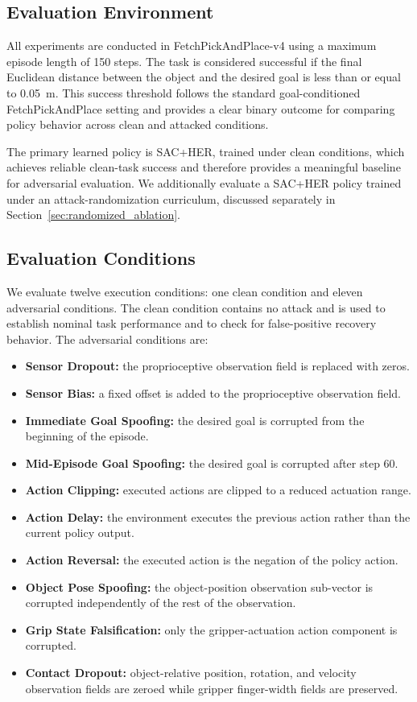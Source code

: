\documentclass[conference]{IEEEtran}
\begin{document}
\subsection{Evaluation Environment}

All experiments are conducted in FetchPickAndPlace-v4 using a maximum episode length of
150 steps. The task is considered successful if the final Euclidean distance between
the object and the desired goal is less than or equal to 0.05~m. This success threshold
follows the standard goal-conditioned FetchPickAndPlace setting and provides a clear
binary outcome for comparing policy behavior across clean and attacked conditions.

The primary learned policy is SAC+HER, trained under clean conditions, which achieves
reliable clean-task success and therefore provides a meaningful baseline for adversarial
evaluation. We additionally evaluate a SAC+HER policy trained under an
attack-randomization curriculum, discussed separately in
Section~\ref{sec:randomized_ablation}.

\subsection{Evaluation Conditions}

We evaluate twelve execution conditions: one clean condition and eleven adversarial
conditions. The clean condition contains no attack and is used to establish nominal
task performance and to check for false-positive recovery behavior. The adversarial
conditions are:

\begin{itemize}
    \item \textbf{Sensor Dropout:} the proprioceptive observation field is replaced
    with zeros.
    \item \textbf{Sensor Bias:} a fixed offset is added to the proprioceptive
    observation field.
    \item \textbf{Immediate Goal Spoofing:} the desired goal is corrupted from the
    beginning of the episode.
    \item \textbf{Mid-Episode Goal Spoofing:} the desired goal is corrupted after
    step 60.
    \item \textbf{Action Clipping:} executed actions are clipped to a reduced
    actuation range.
    \item \textbf{Action Delay:} the environment executes the previous action rather
    than the current policy output.
    \item \textbf{Action Reversal:} the executed action is the negation of the policy
    action.
    \item \textbf{Object Pose Spoofing:} the object-position observation sub-vector is
    corrupted independently of the rest of the observation.
    \item \textbf{Grip State Falsification:} only the gripper-actuation action
    component is corrupted.
    \item \textbf{Contact Dropout:} object-relative position, rotation, and velocity
    observation fields are zeroed while gripper finger-width fields are preserved.
\end{itemize}
\end{document}
